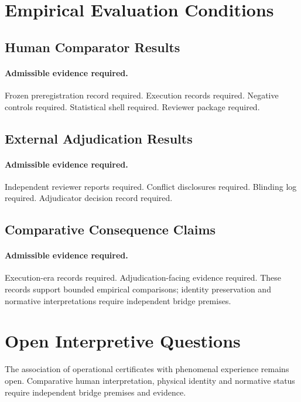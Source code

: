 \documentclass[11pt,a4paper]{article}
\begin{document}
\section{Empirical Evaluation Conditions}

\subsection{Human Comparator Results}


\paragraph{Admissible evidence required.}
Frozen preregistration record required. Execution records required. Negative
controls required. Statistical shell required. Reviewer package required.

\subsection{External Adjudication Results}


\paragraph{Admissible evidence required.}
Independent reviewer reports required. Conflict disclosures required. Blinding
log required. Adjudicator decision record required.

\subsection{Comparative Consequence Claims}


\paragraph{Admissible evidence required.}
Execution-era records required. Adjudication-facing evidence required.
These records support bounded empirical comparisons; identity preservation and normative interpretations require independent bridge premises.

\section{Open Interpretive Questions}
The association of operational certificates with phenomenal experience remains open. Comparative human interpretation, physical identity and normative status require independent bridge premises and evidence.
\end{document}
